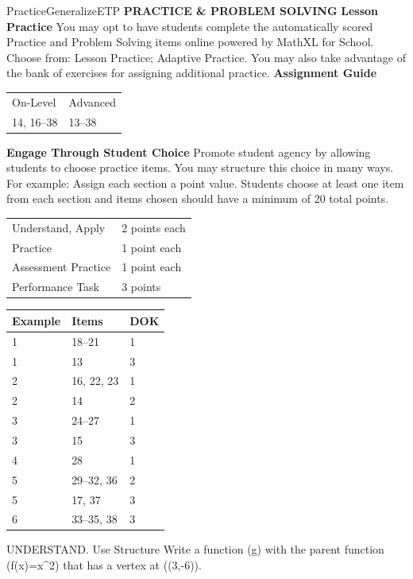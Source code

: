 \documentclass{article}
\newenvironment{item-analysis}{}{}      %
\newenvironment{practice}[2]{}{}        %
\newenvironment{te-addendum}[2]{}{}     %
\newcommand{\answer}[1]{}               %
\newcommand{\te}[1]{}                   %
\begin{document}
\begin{te-addendum}{Practice}{GeneralizeETP}
\textbf{PRACTICE \& PROBLEM SOLVING}
\textbf{Lesson Practice} You may opt to have students complete the automatically scored Practice and Problem Solving items online powered by MathXL for School.
Choose from: Lesson Practice; Adaptive Practice.
You may also take advantage of the bank of exercises for assigning additional practice.
\textbf{Assignment Guide}
\begin{tabular}{ll}
On-Level & Advanced \\
14, 16--38 & 13--38 \\
\end{tabular}
\textbf{Engage Through Student Choice}
Promote student agency by allowing students to choose practice items. You may structure this choice in many ways.
For example:
Assign each section a point value. Students choose at least one item from each section and items chosen should have a minimum of 20 total points.
\begin{tabular}{ll}
Understand, Apply & 2 points each \\
Practice & 1 point each \\
Assessment Practice & 1 point each \\
Performance Task & 3 points \\
\end{tabular}
\te{Practice \& Problem Solving and video tutorials are available at SavvasRealize.com. Scan the QR code to access a video tutorial.}
\end{te-addendum}
\begin{item-analysis}
\begin{tabular}{lll}
\toprule
Example & Items & DOK \\
\midrule
1 & 18--21 & 1 \\
1 & 13 & 3 \\
2 & 16, 22, 23 & 1 \\
2 & 14 & 2 \\
3 & 24--27 & 1 \\
3 & 15 & 3 \\
4 & 28 & 1 \\
5 & 29--32, 36 & 2 \\
5 & 17, 37 & 3 \\
6 & 33--35, 38 & 3 \\
\bottomrule
\end{tabular}
\end{item-analysis}
\begin{practice}{13}{3}
UNDERSTAND. Use Structure Write a function (g) with the parent function (f(x)=x^2) that has a vertex at ((3,-6)).
\answer{(g(x)=(x-3)^2-6)}
\end{practice}
\end{document}
